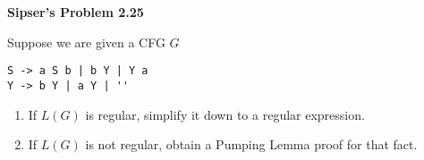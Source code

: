 \documentclass[12pt]{article}
\begin{document}
{\hfill {\bf Sipser's Problem 2.25} \hfill}

Suppose we are given a CFG $G$

\begin{verbatim}
S -> a S b | b Y | Y a
Y -> b Y | a Y | ''
\end{verbatim}

\begin{enumerate}
\item If $L(G)$ is regular, simplify it down to a regular expression.
\item If $L(G)$ is not regular, obtain a Pumping Lemma proof for that fact.
\end{enumerate}
\end{document}
